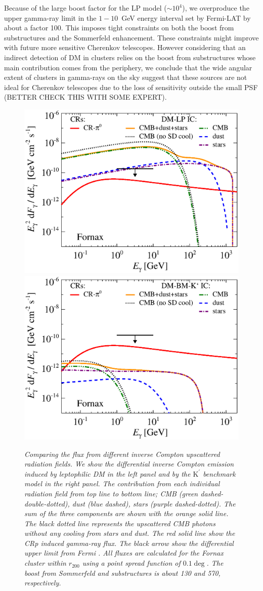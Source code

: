 \documentclass[10pt,aps,pra,reprint,amsmath,amsfonts,amssymb,showpacs]{revtex4-1}
\newcommand{\rmn}{\mathrm}
\newcommand{\Kp}{\rmn{K}^\prime}
\newcommand{\rvir}{r_{200}}
\begin{document}
Because of the large boost factor for the LP model ($\sim 10^4$), we
overproduce the upper gamma-ray limit in the $1-10$~GeV energy
interval set by Fermi-LAT by about a factor 100. This imposes tight
constraints on both the boost from substructures and the Sommerfeld
enhancement. These constraints might improve with future more
sensitive Cherenkov telescopes. However considering that an indirect
detection of DM in clusters relies on the boost from substructures
whose main contribution comes from the periphery, we conclude that the
wide angular extent of clusters in gamma-rays on the sky suggest that
these sources are not ideal for Cherenkov telescopes due to the loss
of sensitivity outside the small PSF (BETTER CHECK THIS WITH SOME
EXPERT).

\begin{figure}
\begin{minipage}{2.0\columnwidth}
\includegraphics[width=0.49\columnwidth]{figures/flux.IRcomp.v9.0.1deg.1.6T.SubMass.elmu.SF300.noMW.woGal.eps}
\includegraphics[width=0.49\columnwidth]{figures/flux.IRcomp.BMv9.0.1deg.SubMass.noMW.woGal.eps}
\caption{\it Comparing the flux from different inverse Compton
  upscattered radiation fields. We show the differential inverse
  Compton emission induced by leptophilic DM in the left panel and by
  the $\Kp$ benchmark model in the right panel. The contribution from
  each individual radiation field from top line to bottom line; CMB
  (green dashed-double-dotted), dust (blue dashed), stars (purple
  dashed-dotted). The sum of the three components are shown with the
  orange solid line. The black dotted line represents the upscattered
  CMB photons without any cooling from stars and dust. The red solid
  line show the CRp induced gamma-ray flux. The black arrow show the
  differential upper limit from Fermi \cite{2010ApJ...717L..71A}. All
  fluxes are calculated for the Fornax cluster within $\rvir$ using a
  point spread function of $0.1\deg$. The boost from Sommerfeld and
  substructures is about 130 and 570, respectively.}
 \label{fig:IR_comp}
\end{minipage}
\end{figure}
\end{document}
